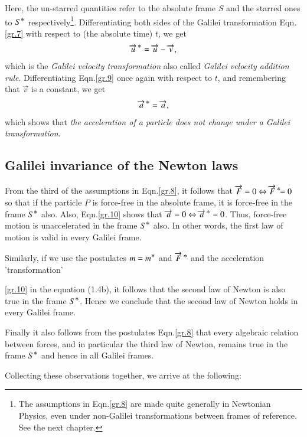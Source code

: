 Here, the un-starred quantities refer to the absolute frame 
$S$ and the starred ones to $S^{\textstyle \ast}$ 
respectively\footnote{The assumptions in Eqn.\eqref{gr.8} 
are made quite generally in Newtonian Physics, even under 
{non-Galilei} transformations between frames of reference. 
See the next chapter.}. Differentiating both sides of the 
Galilei transformation  Eqn.\eqref{gr.7} with respect to 
(the absolute time) $t$, we get
\begin{align}\label{gr.9}
{\overrightarrow{u}^{\,{\ensuremath{\textstyle \ast}}}} = \overrightarrow{u} -\overrightarrow{v},
\end{align}
which is the \textsl{Galilei velocity transformation} also 
called \textsl{Galilei velocity addition rule}. 
Differentiating Eqn.\eqref{gr.9} once again with respect to 
$t$, and remembering that $\vec{v}$ is a constant, we get
\begin{align}\label{gr.10}
{\overrightarrow{a}^{\,{\ensuremath{\textstyle \ast}}}} = \overrightarrow{a},
\end{align}
which shows that \textsl{the acceleration of a particle does 
not change under a Galilei transformation}.

\subsection{Galilei invariance of the Newton 
laws} 

From the third of the assumptions in Eqn.\eqref{gr.8}, it 
follows that $\overrightarrow{F} = 0 \Leftrightarrow{\overrightarrow{F}^{\,{\ensuremath{\textstyle \ast}}}}\hspace*{-4pt} = 0$ 
so that if the particle $P$ is force-free in the absolute 
frame, it is force-free in the frame $S^{\textstyle \ast}$ also. Also, 
Eqn.\eqref{gr.10} shows that $\overrightarrow{a} = 0\Leftrightarrow 
{\overrightarrow{a}^{\,{\ensuremath{\textstyle \ast}}}} = 0$. Thus, force-free motion is unaccelerated in 
the frame $S^{\textstyle \ast}$ also. In other words, the first law of 
motion is valid in every Galilei frame.

Similarly, if we use the postulates $m=m^{\textstyle \ast}$ and 
$ \overrightarrow{F}\,^{\textstyle \ast}$ and the acceleration 'transformation' 
 
\eqref{gr.10} in the equation (1.4b), it follows that  the 
second law of Newton is also true in the frame $S^{\textstyle \ast}$. 
Hence we conclude that the second law of Newton holds in 
every Galilei frame.

Finally it also follows from the postulates 
Eqn.\eqref{gr.8} that every algebraic relation between 
forces, and in particular the third law of Newton, remains 
true in the frame $S^{\textstyle \ast}$ and hence in all Galilei frames.

Collecting these observations together, we arrive at the 
following:

